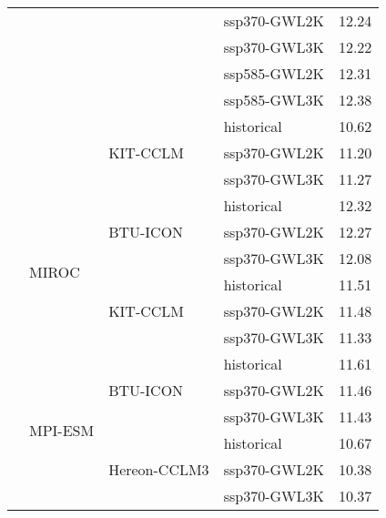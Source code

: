 \begin{table}[!htbp]
\begin{tabular}{lll|l|c}
 &  &  & ssp370-GWL2K & 12.24 \\
 &  &  & ssp370-GWL3K & 12.22 \\
 &  &  & ssp585-GWL2K & 12.31 \\
 &  &  & ssp585-GWL3K & 12.38 \\
\cmidrule(lr){3-5}
 &  & \multirow{3}{*}{KIT-CCLM} & historical & 10.62 \\
 &  &  & ssp370-GWL2K & 11.20 \\
 &  &  & ssp370-GWL3K & 11.27 \\
\cmidrule(lr){3-5}
\cmidrule(lr){2-5}
 & \multirow{6}{*}{MIROC} & \multirow{3}{*}{BTU-ICON} & historical & 12.32 \\
 &  &  & ssp370-GWL2K & 12.27 \\
 &  &  & ssp370-GWL3K & 12.08 \\
\cmidrule(lr){3-5}
 &  & \multirow{3}{*}{KIT-CCLM} & historical & 11.51 \\
 &  &  & ssp370-GWL2K & 11.48 \\
 &  &  & ssp370-GWL3K & 11.33 \\
\cmidrule(lr){3-5}
\cmidrule(lr){2-5}
 & \multirow{6}{*}{MPI-ESM} & \multirow{3}{*}{BTU-ICON} & historical & 11.61 \\
 &  &  & ssp370-GWL2K & 11.46 \\
 &  &  & ssp370-GWL3K & 11.43 \\
\cmidrule(lr){3-5}
 &  & \multirow{3}{*}{Hereon-CCLM3} & historical & 10.67 \\
 &  &  & ssp370-GWL2K & 10.38 \\
 &  &  & ssp370-GWL3K & 10.37 \\
\bottomrule
\end{tabular}
\end{table}
